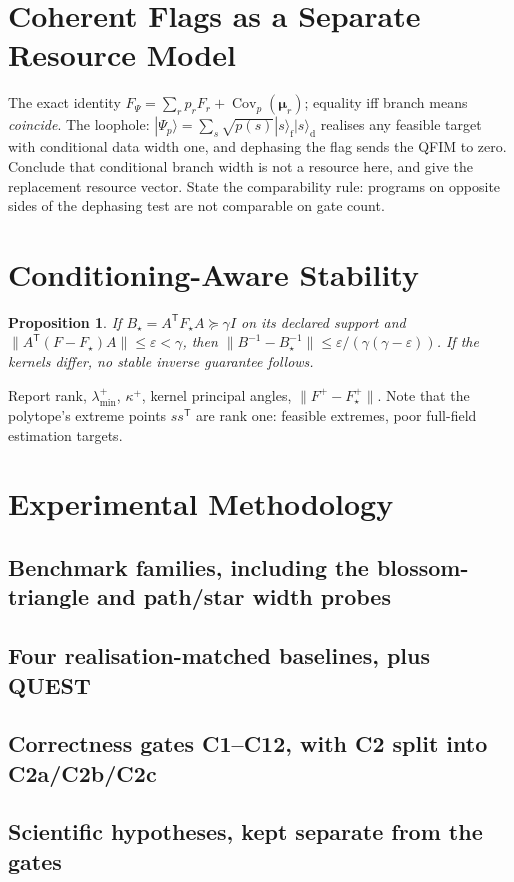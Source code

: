 \documentclass[11pt]{article}
\newtheorem{proposition}{Proposition}
\begin{document}
\section{Coherent Flags as a Separate Resource Model}
The exact identity $F_\Psi=\sum_rp_rF_r+\operatorname{Cov}_p(\bm\mu_r)$; equality iff branch
means \emph{coincide}. The loophole: $|\Psi_p\rangle=\sum_s\sqrt{p(s)}|s\rangle_{\mathrm
f}|s\rangle_{\mathrm d}$ realises any feasible target with conditional data width one, and
dephasing the flag sends the QFIM to zero. Conclude that conditional branch width is not a
resource here, and give the replacement resource vector. State the comparability rule:
programs on opposite sides of the dephasing test are not comparable on gate count.

\section{Conditioning-Aware Stability}
\begin{proposition}
If $B_\star=A^{\mathsf T}F_\star A\succeq\gamma I$ on its declared support and
$\|A^{\mathsf T}(F-F_\star)A\|\le\varepsilon<\gamma$, then
$\|B^{-1}-B_\star^{-1}\|\le\varepsilon/(\gamma(\gamma-\varepsilon))$. If the kernels differ,
no stable inverse guarantee follows.
\end{proposition}
Report rank, $\lambda^+_{\min}$, $\kappa^+$, kernel principal angles, $\|F^+-F_\star^+\|$.
Note that the polytope's extreme points $ss^{\mathsf T}$ are rank one: feasible extremes,
poor full-field estimation targets.

\section{Experimental Methodology}
\subsection{Benchmark families, including the blossom-triangle and path/star width probes}
\subsection{Four realisation-matched baselines, plus QUEST}
\subsection{Correctness gates C1--C12, with C2 split into C2a/C2b/C2c}
\subsection{Scientific hypotheses, kept separate from the gates}
\end{document}
